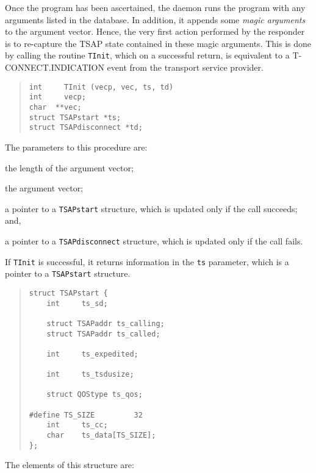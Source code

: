 Once the program has been ascertained,
the daemon runs the program with any arguments listed in the database.
In addition, it appends some {\em magic arguments\/} to the argument vector.
Hence, the very first action performed by the responder is to re-capture the
TSAP state contained in these magic arguments.
This is done by calling the routine \verb"TInit",
which on a successful return,
is equivalent to a {\sf T-CONNECT.INDICATION\/} event from the transport
service provider.
\begin{quote}\small\begin{verbatim}
int     TInit (vecp, vec, ts, td)
int     vecp;
char  **vec;
struct TSAPstart *ts;
struct TSAPdisconnect *td;
\end{verbatim}\end{quote}
The parameters to this procedure are:
\begin{describe}
\item[\verb"vecp":] the length of the argument vector;

\item[\verb"vec":] the argument vector;

\item[\verb"ts":] a pointer to a \verb"TSAPstart" structure, which is updated
only if the call succeeds;
and,

\item[\verb"td":] a pointer to a  \verb"TSAPdisconnect" structure, which is
updated only if the call fails.
\end{describe}
If \verb"TInit" is successful,
it returns information in the \verb"ts" parameter,
which is a pointer to a \verb"TSAPstart" structure.
\begin{quote}\small\begin{verbatim}
struct TSAPstart {
    int     ts_sd;

    struct TSAPaddr ts_calling;
    struct TSAPaddr ts_called;

    int     ts_expedited;

    int     ts_tsdusize;

    struct QOStype ts_qos;

#define TS_SIZE         32
    int     ts_cc;
    char    ts_data[TS_SIZE];
};
\end{verbatim}\end{quote}
The elements of this structure are:
